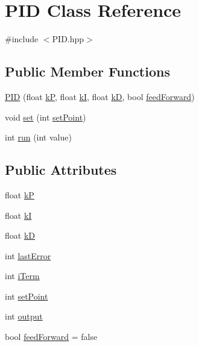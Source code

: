 \hypertarget{classPID}{\section{P\-I\-D Class Reference}
\label{classPID}
}


{\ttfamily \#include $<$P\-I\-D.\-hpp$>$}

\subsection*{Public Member Functions}
\begin{DoxyCompactItemize}
\item 
\hyperlink{classPID_acf0310be28ae782627e1671f4a663543}{P\-I\-D} (float \hyperlink{classPID_ac4815cca85109a6e13b10c2415104328}{k\-P}, float \hyperlink{classPID_ac686925341bcab06b11df109533b6807}{k\-I}, float \hyperlink{classPID_a5a07dca1e267a62af08ebd07781f1e9e}{k\-D}, bool \hyperlink{classPID_aaad110febd9150a54528b9cb6ff145e8}{feed\-Forward})
\item 
void \hyperlink{classPID_add6409a5065a91aba8e1982521fbc09c}{set} (int \hyperlink{classPID_a2686d248042aff0e1730dd3a0b705fd2}{set\-Point})
\item 
int \hyperlink{classPID_a58191a0c19f6ea9761bf7cb8f1b7137c}{run} (int value)
\end{DoxyCompactItemize}
\subsection*{Public Attributes}
\begin{DoxyCompactItemize}
\item 
float \hyperlink{classPID_ac4815cca85109a6e13b10c2415104328}{k\-P}
\item 
float \hyperlink{classPID_ac686925341bcab06b11df109533b6807}{k\-I}
\item 
float \hyperlink{classPID_a5a07dca1e267a62af08ebd07781f1e9e}{k\-D}
\item 
int \hyperlink{classPID_abbf07ac762e11dc7fedf56302c7bda8e}{last\-Error}
\item 
int \hyperlink{classPID_a0ab15f9f3e6d301b25696a32469ba3eb}{i\-Term}
\item 
int \hyperlink{classPID_a2686d248042aff0e1730dd3a0b705fd2}{set\-Point}
\item 
int \hyperlink{classPID_a34f2887b625d8d49e546b4e2fb389d04}{output}
\item 
bool \hyperlink{classPID_aaad110febd9150a54528b9cb6ff145e8}{feed\-Forward} = false
\end{DoxyCompactItemize}


